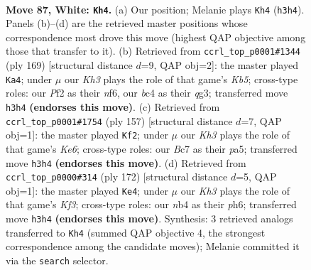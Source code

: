\documentclass[11pt]{article}
\begin{document}
\clearpage

\begin{figure}[p]\centering
\begin{subfigure}{0.46\textwidth}\centering
\resizebox{\linewidth}{!}{%
\newchessgame
\chessboard[
  setfen={6k1/2B5/8/8/1nb5/7K/5P2/8 w - - 19 87},
  showmover=false,
  pgfstyle=straightmove, color=movearrow, markmove={h3-h4}
]}
\caption{}
\end{subfigure}\hfill
\begin{subfigure}{0.46\textwidth}\centering
\resizebox{\linewidth}{!}{%
\newchessgame
\chessboard[
  setfen={8/2K5/5N2/8/1k6/6Q1/4B3/8 b - - 2 85},
  showmover=false,
  pgfstyle=straightmove, color=movearrow, markmove={b4-a4}
]}
\caption{}
\end{subfigure}
\\[4pt]
\begin{subfigure}{0.46\textwidth}\centering
\resizebox{\linewidth}{!}{%
\newchessgame
\chessboard[
  setfen={8/8/n5B1/P7/8/2p1k3/8/1K6 b - - 0 79},
  showmover=false,
  pgfstyle=straightmove, color=movearrow, markmove={e3-f2}
]}
\caption{}
\end{subfigure}\hfill
\begin{subfigure}{0.46\textwidth}\centering
\resizebox{\linewidth}{!}{%
\newchessgame
\chessboard[
  setfen={8/3B4/5k1p/7P/7b/5K2/8/8 w - - 2 87},
  showmover=false,
  pgfstyle=straightmove, color=movearrow, markmove={f3-e4}
]}
\caption{}
\end{subfigure}
\caption{\textbf{Move 87, White: \texttt{Kh4}.} (a) Our position; Melanie plays \texttt{Kh4} (\texttt{h3h4}). Panels (b)--(d) are the retrieved master positions whose correspondence most drove this move (highest QAP objective among those that transfer to it). (b) Retrieved from \texttt{ccrl\_top\_p0001\#1344} (ply 169) [structural distance $d$=9, QAP obj=2]: the master played \texttt{Ka4}; under $\mu$ our \emph{Kh3} plays the role of that game's \emph{Kb5}; cross-type roles: our \emph{P}f2 as their \emph{n}f6, our \emph{b}c4 as their \emph{q}g3; transferred move \texttt{h3h4} \textbf{(endorses this move)}. (c) Retrieved from \texttt{ccrl\_top\_p0001\#1754} (ply 157) [structural distance $d$=7, QAP obj=1]: the master played \texttt{Kf2}; under $\mu$ our \emph{Kh3} plays the role of that game's \emph{Ke6}; cross-type roles: our \emph{B}c7 as their \emph{p}a5; transferred move \texttt{h3h4} \textbf{(endorses this move)}. (d) Retrieved from \texttt{ccrl\_top\_p0000\#314} (ply 172) [structural distance $d$=5, QAP obj=1]: the master played \texttt{Ke4}; under $\mu$ our \emph{Kh3} plays the role of that game's \emph{Kf3}; cross-type roles: our \emph{n}b4 as their \emph{p}h6; transferred move \texttt{h3h4} \textbf{(endorses this move)}. Synthesis: 3 retrieved analogs transferred to \texttt{Kh4} (summed QAP objective 4, the strongest correspondence among the candidate moves); Melanie committed it via the \texttt{search} selector.}
\label{fig:thought-m172}
\end{figure}
\end{document}
